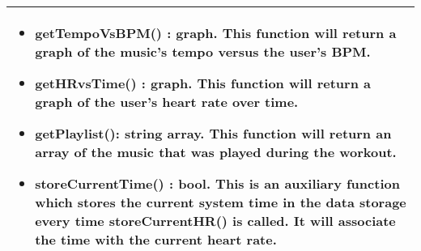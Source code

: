 \begin{center}
\begin{tabular}{|C{15cm}|}
\begin{itemize}
                    \item getTempoVsBPM() : graph. This function will return a graph of the music's tempo versus the user's BPM.
                    \item getHRvsTime() : graph. This function will return a graph of the user's heart rate over time.
                    \item getPlaylist(): string array. This function will return an array of the music that was played during the workout.
                    \item storeCurrentTime() : bool. This is an auxiliary function which stores the current system time in the data storage every time storeCurrentHR() is called. It will associate the time with the current heart rate.
                \end{itemize}
                \\
            \hline
    \end{tabular}
\end{center}

